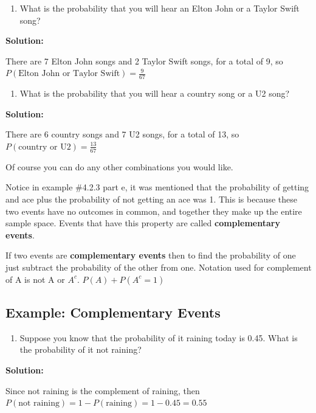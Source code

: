 \documentclass[]{book}
\providecommand{\tightlist}{%
  \setlength{\itemsep}{0pt}\setlength{\parskip}{0pt}}
\begin{document}
\begin{enumerate}
\def\labelenumi{\alph{enumi}.}
\setcounter{enumi}{5}
\tightlist
\item
  What is the probability that you will hear an Elton John or a Taylor
  Swift song?
\end{enumerate}

\textbf{Solution:}

There are 7 Elton John songs and 2 Taylor Swift songs, for a total of 9, so \(P(\text{Elton John or Taylor Swift})=\frac{9}{67}\)

\begin{enumerate}
\def\labelenumi{\alph{enumi}.}
\setcounter{enumi}{6}
\tightlist
\item
  What is the probability that you will hear a country song or a U2
  song?
\end{enumerate}

\textbf{Solution:}

There are 6 country songs and 7 U2 songs, for a total of 13, so \(P(\text{country or U2})=\frac{13}{67}\)

Of course you can do any other combinations you would like.

Notice in example \#4.2.3 part e, it was mentioned that the probability
of getting and ace plus the probability of not getting an ace was 1. This is because these two events have no outcomes in common, and together they make up the
entire sample space. Events that have this property are called \textbf{complementary events}.

If two events are \textbf{complementary events} then to find the probability
of one just subtract the probability of the other from one. Notation
used for complement of A is not A or \(A^{c}\). \(P(A)+P(A^{c}=1)\)

\hypertarget{example-complementary-events}{%
\subsection{Example: Complementary Events}\label{example-complementary-events}}

\begin{enumerate}
\def\labelenumi{\alph{enumi}.}
\tightlist
\item
  Suppose you know that the probability of it raining today is 0.45.
  What is the probability of it not raining?
\end{enumerate}

\textbf{Solution:}

Since not raining is the complement of raining, then \(P(\text{not raining})=1-P(\text{raining}) = 1-0.45=0.55\)
\end{document}
